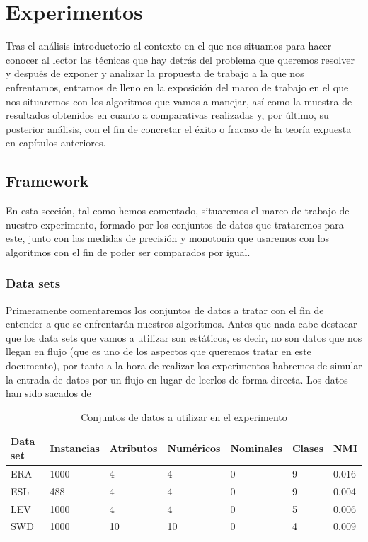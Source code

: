 \chapter[Capítulo 6. Experimentos]{Experimentos}

Tras el análisis introductorio al contexto en el que nos situamos para hacer conocer al lector las técnicas que hay detrás del problema que queremos resolver y después de exponer y analizar la propuesta de trabajo a la que nos enfrentamos, entramos de lleno en la exposición del marco de trabajo en el que nos situaremos con los algoritmos que vamos a manejar, así como la muestra de resultados obtenidos en cuanto a comparativas realizadas y, por último, su posterior análisis, con el fin de concretar el éxito o fracaso de la teoría expuesta en capítulos anteriores.

\section{Framework}

En esta sección, tal como hemos comentado, situaremos el marco de trabajo de nuestro experimento, formado por los conjuntos de datos que trataremos para este, junto con las medidas de precisión y monotonía que usaremos con los algoritmos con el fin de poder ser comparados por igual.

\subsection{Data sets}

Primeramente comentaremos los conjuntos de datos a tratar con el fin de entender a que se enfrentarán nuestros algoritmos. Antes que nada cabe destacar que los data sets que vamos a utilizar son estáticos, es decir, no son datos que nos llegan en flujo (que es uno de los aspectos que queremos tratar en este documento), por tanto a la hora de realizar los experimentos habremos de simular la entrada de datos por un flujo en lugar de leerlos de forma directa. Los datos han sido sacados de \cite{ref16}



\begin{table}[]
	\begin{tabular}{|l|l|l|l|l|l|l|}
		\hline
		Data set & Instancias & Atributos & Numéricos & Nominales & Clases & NMI   \\ \hline
		ERA      & 1000       & 4         & 4         & 0         & 9      & 0.016 \\ \hline
		ESL      & 488        & 4         & 4         & 0         & 9      & 0.004 \\ \hline
		LEV      & 1000       & 4         & 4         & 0         & 5      & 0.006 \\ \hline
		SWD      & 1000       & 10        & 10        & 0         & 4      & 0.009 \\ \hline
	\end{tabular}
	\caption{Conjuntos de datos a utilizar en el experimento}
\end{table}


